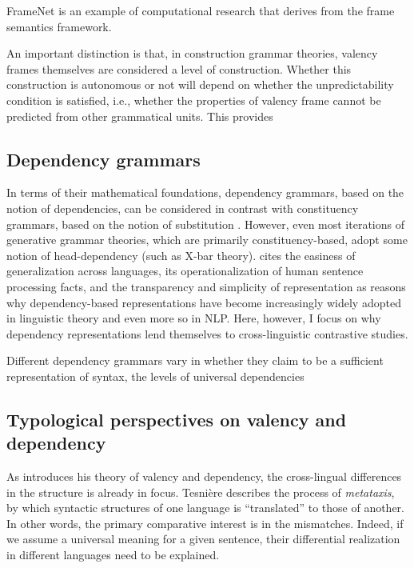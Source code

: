 FrameNet \citep{fillmore2015} is an example of computational research that derives from the frame semantics framework.


An important distinction is that, in construction grammar theories, valency frames themselves are considered a level of construction. Whether this construction is autonomous or not will depend on whether the unpredictability condition is satisfied, i.e., whether the properties of valency frame cannot be predicted from other grammatical units. This provides 

\subsection{Dependency grammars}\label{subsec:depgrammar}

In terms of their mathematical foundations, dependency grammars, based on the notion of dependencies, can be considered in contrast with constituency grammars, based on the notion of substitution \citep{stabler2019}. However, even most iterations of generative grammar theories, which are primarily constituency-based, adopt some notion of head-dependency (such as X-bar theory). \citet{demarneffe2019} cites the easiness of generalization across languages, its operationalization of human sentence processing facts, and the transparency and simplicity of representation as reasons why dependency-based representations have become increasingly widely adopted in linguistic theory and even more so in NLP. Here, however, I focus on why dependency representations lend themselves to cross-linguistic contrastive studies. 

Different dependency grammars vary in whether they claim to be a sufficient representation of syntax, the levels of \citet{demarneffe2019}
universal dependencies \citep{demarneffe2021}




\subsection{Typological perspectives on valency and dependency}\label{subsec:typology}

As \citet{tesniere1959} introduces his theory of valency and dependency, the cross-lingual differences in the structure is already in focus. Tesnière describes the process of \textit{metataxis}, by which syntactic structures of one language is ``translated'' to those of another. In other words, the primary comparative interest is in the mismatches. Indeed, if we assume a universal meaning for a given sentence, their differential realization in different languages need to be explained.

